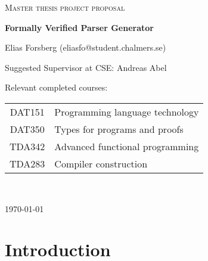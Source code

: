\documentclass{article}
\begin{document}
\begin{titlepage}
  

\centering
  
  
{\scshape\LARGE Master thesis project proposal\\}
  
\vspace{0.5cm}
  
{\huge\bfseries Formally Verified Parser Generator\\}
  
\vspace{2cm}
  
{\Large Elias Forsberg (eliasfo@student.chalmers.se)\\}
  
\vspace{1.0cm}
  
{\large Suggested Supervisor at CSE: Andreas Abel\\}
  
\vspace{1.5cm}
  
{\large Relevant completed courses:\par}
  
{\itshape %
	\begin{tabular}{cl}
		DAT151 & Programming language technology \\
		DAT350 & Types for programs and proofs \\
		TDA342 & Advanced functional programming \\
		TDA283 & Compiler construction \\
	\end{tabular} \\
}
\vfill

\vfill
  
{\large \today\\} 

\end{titlepage}

\section{Introduction}

\end{document}
